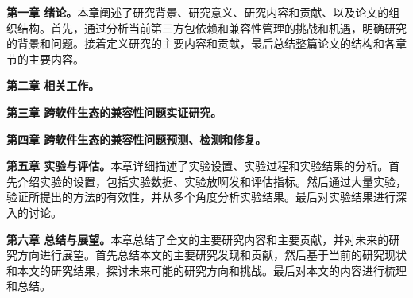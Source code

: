 \textbf{第一章 绪论。}本章阐述了研究背景、研究意义、研究内容和贡献、以及论文的组织结构。首先，通过分析当前第三方包依赖和兼容性管理的挑战和机遇，明确研究的背景和问题。接着定义研究的主要内容和贡献，最后总结整篇论文的结构和各章节的主要内容。

\textbf{第二章 相关工作。}

\textbf{第三章 跨软件生态的兼容性问题实证研究。}

\textbf{第四章 跨软件生态的兼容性问题预测、检测和修复。}

\textbf{第五章 实验与评估。}本章详细描述了实验设置、实验过程和实验结果的分析。首先介绍实验的设置，包括实验数据、实验放啊发和评估指标。然后通过大量实验，验证所提出的方法的有效性，并从多个角度分析实验结果。最后对实验结果进行深入的讨论。

\textbf{第六章 总结与展望。}本章总结了全文的主要研究内容和主要贡献，并对未来的研究方向进行展望。首先总结本文的主要研究发现和贡献，然后基于当前的研究现状和本文的研究结果，探讨未来可能的研究方向和挑战。最后对本文的内容进行梳理和总结。


